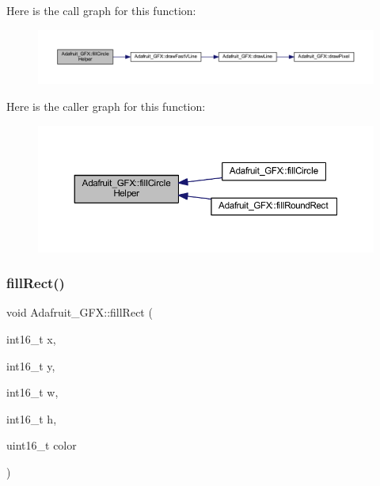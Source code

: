 Here is the call graph for this function\+:
\nopagebreak
\begin{figure}[H]
\begin{center}
\leavevmode
\includegraphics[width=350pt]{d9/d97/class_adafruit___g_f_x_a2242d3560b08c6480084152b6660052a_cgraph}
\end{center}
\end{figure}
Here is the caller graph for this function\+:
\nopagebreak
\begin{figure}[H]
\begin{center}
\leavevmode
\includegraphics[width=350pt]{d9/d97/class_adafruit___g_f_x_a2242d3560b08c6480084152b6660052a_icgraph}
\end{center}
\end{figure}
\mbox{\label{class_adafruit___g_f_x_aa43cf1dfe6c17d040a0f1fd5ffbe9d69}} 
\subsubsection{\texorpdfstring{fill\+Rect()}{fillRect()}}
{\footnotesize\ttfamily void Adafruit\+\_\+\+G\+F\+X\+::fill\+Rect (\begin{DoxyParamCaption}\item[{int16\+\_\+t}]{x,  }\item[{int16\+\_\+t}]{y,  }\item[{int16\+\_\+t}]{w,  }\item[{int16\+\_\+t}]{h,  }\item[{uint16\+\_\+t}]{color }\end{DoxyParamCaption})}

